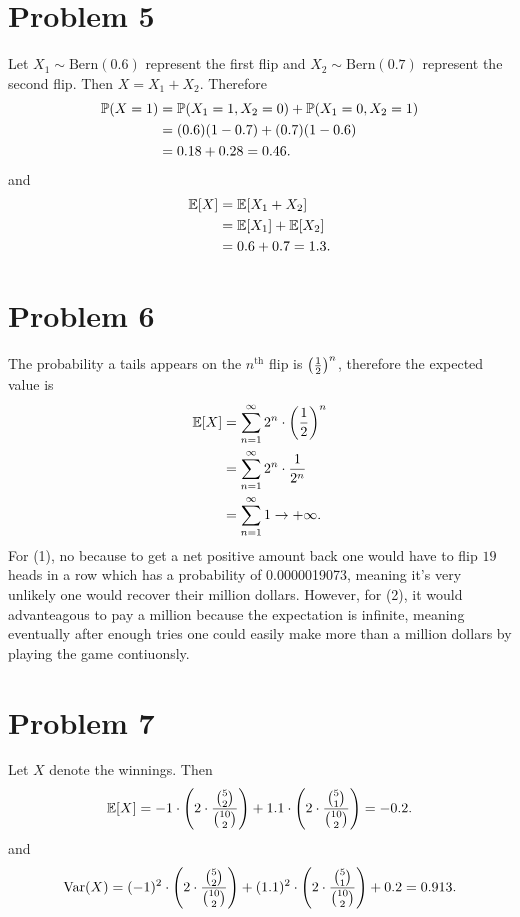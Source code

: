 \documentclass[12pt]{extarticle}
\begin{document}
\section*{Problem 5}
Let $X_1 \sim \text{Bern}(0.6)$ represent the first flip and $X_2 \sim \text{Bern}(0.7)$ represent the second flip. Then $X = X_1 + X_2$. Therefore 
\begin{align*}
	\mathbb{P}\qty(X = 1) &= \mathbb{P}\qty(X_1 = 1, X_2 = 0) + \mathbb{P}\qty(X_1 = 0, X_2 = 1) \\
	&= (0.6)(1-0.7) + (0.7)(1-0.6) \\
	&= 0.18 + 0.28 = 0.46
.\end{align*}
and
\begin{align*}
	\mathbb{E}\qty[X] &= \mathbb{E}\qty[X_1 + X_2] \\
					&= \mathbb{E}\qty[X_1] + \mathbb{E}\qty[X_2] \\
					&= 0.6 + 0.7 = 1.3
.\end{align*}

\section*{Problem 6}
The probability a tails appears on the $n^{\text{th}}$ flip is $\qty(\frac{1}{2})^n$, therefore the expected value is
\begin{align*}
	\mathbb{E}\qty[X] &= \sum_{n=1}^{\infty} 2^n \cdot\qty(\frac{1}{2})^n \\
	        &= \sum_{n=1}^{\infty} 2^n \cdot\frac{1}{2^n} \\
	        &= \sum_{n=1}^{\infty} 1 \to +\infty
.\end{align*}
For (1), no because to get a net positive amount back one would have to flip $19$ heads in a row which has a probability of 0.0000019073, meaning it's very unlikely one would recover their million dollars. However, for (2), it would advanteagous to pay a million because the expectation is infinite, meaning eventually after enough tries one could easily make more than a million dollars by playing the game contiuonsly.

\section*{Problem 7}
Let $X$ denote the winnings. Then
\begin{align*}
	\mathbb{E}\qty[X] = -1 \cdot \qty(2\cdot\frac{\binom{5}{2}}{\binom{10}{2}}) + 1.1 \cdot \qty(2\cdot\frac{\binom{5}{1}}{\binom{10}{2}}) = -0.2
.\end{align*}
and
\[
	\text{Var}\qty(X) = (-1)^2 \cdot \qty(2\cdot\frac{\binom{5}{2}}{\binom{10}{2}}) + (1.1)^2 \cdot \qty(2\cdot\frac{\binom{5}{1}}{\binom{10}{2}}) + 0.2 = 0.913
.\]
\end{document}
